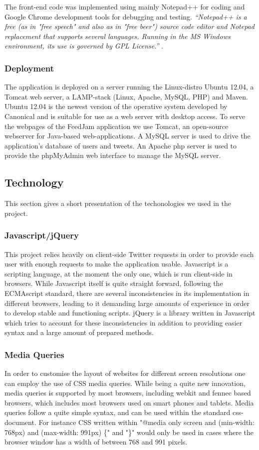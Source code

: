 The front-end code was implemented using mainly Notepad++ for coding and Google Chrome development tools for debugging and testing. \textit{``Notepad++ is a free (as in "free speech" and also as in "free beer") source code editor and Notepad replacement that supports several languages. Running in the MS Windows environment, its use is governed by GPL License.''} \cite{Ho2012}.

\subsubsection{Deployment}
The application is deployed on a server running the Linux-distro Ubuntu 12.04, a Tomcat web server, a LAMP-stack (Linux, Apache, MySQL, PHP) and Maven. Ubuntu 12.04 is the newest version of the operative system developed by Canonical and is suitable for use as a web server with desktop access. To serve the webpages of the FeedJam application we use Tomcat, an open-source webserver for Java-based web-applications. A MySQL server is used to drive the application's database of users and tweets. An Apache php server is used to provide the phpMyAdmin web interface to manage the MySQL server.


\subsection{Technology}
This section gives a short presentation of the techonologies we used in the project. 

\subsubsection{Javascript/jQuery} %
This project relies heavily on client-side Twitter requests in order to provide each user with enough requests to make the application usable. Javascript is a scripting language, at the moment the only one, which is run client-side in browsers. While Javascript itself is quite straight forward, following the ECMAscript standard, there are several inconsistencies in its implementation in different browsers, leading to it demanding large amounts of experience in order to develop stable and functioning scripts. jQuery is a library written in Javascript which tries to account for these inconsistencies in addition to providing easier syntax and a large amount of prepared methods.

\subsubsection{Media Queries} %
In order to customise the layout of websites for different screen resolutions one can employ the use of CSS media queries. While being a quite new innovation, media queries is supported by most browsers, including webkit and fennec based browsers, which includes most browsers used on smart phones and tablets. Media queries follow a quite simple syntax, and can be used within the standard css-document. For instance CSS written within "@media only screen and (min-width: 768px) and (max-width: 991px) \{" and "\}" would only be used in cases where the browser window has a width of between 768 and 991 pixels. 

